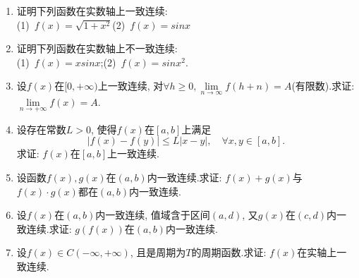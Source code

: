 \begin{enumerate}
	\item 证明下列函数在实数轴上一致连续: \\
	(1)\ $f(x)=\sqrt{1+x^2}$\qquad (2)\ $f(x)=sinx$
	\item 证明下列函数在实数轴上不一致连续: \\
	(1)\ $f(x)=xsinx$;\qquad(2)\ $f(x)=sinx^2$.
	\item 设$f(x)$在$[0,+\infty)$上一致连续, 对$\forall h\ge 0,\lim\limits_{n\rightarrow \infty}f(h+n)=A$(有限数).求证:$\lim\limits_{n\rightarrow +\infty}f(x)=A$.
	\item 设存在常数$L>0$, 使得$f(x)$在$[a,b]$上满足$$
	|f(x)-f(y)|\le L|x-y|,\quad \forall x,y\in [a,b].
	$$求证: $f(x)$在$[a,b]$上一致连续.
	\item 设函数$f(x),g(x)$在$(a,b)$内一致连续.求证: $f(x)+g(x)$与$f(x)\cdot g(x)$都在$(a,b)$内一致连续.
	\item 设$f(x)$在$(a,b)$内一致连续, 值域含于区间$(a,d)$, 又$g(x)$在$(c,d)$内一致连续.求证: $g(f(x))$在$(a,b)$内一致连续.
	\item 设$f(x)\in C(-\infty,+\infty)$, 且是周期为$T$的周期函数.求证: $f(x)$在实轴上一致连续.
	
\end{enumerate}